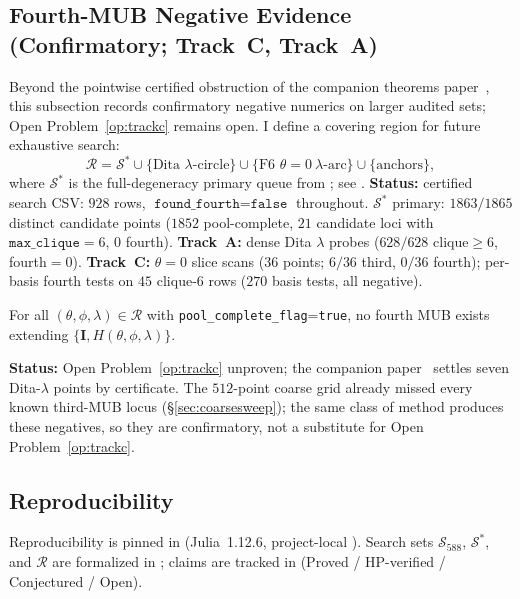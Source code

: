 \documentclass[onecolumn]{IEEEtran}
\begin{document}
\subsection{Fourth-MUB Negative Evidence (Confirmatory; Track~C, Track~A)}
\label{sec:trackc}
Beyond the pointwise certified obstruction of the companion theorems paper~\cite{JaupiTheorems2026}, this subsection records confirmatory negative numerics on larger audited sets; Open Problem~\ref{op:trackc} remains open.
I define a covering region for future exhaustive search:
\[
\mathcal{R}=\mathcal{S}^*\cup\{\text{Dita }\lambda\text{-circle}\}\cup\{\text{F6 }\theta=0\ \lambda\text{-arc}\}\cup\{\text{anchors}\},
\]
where $\mathcal{S}^*$ is the full-degeneracy primary queue from ; see .
\textbf{Status:} certified search CSV: $928$ rows, $\texttt{found\_fourth}=\texttt{false}$ throughout.
$\mathcal{S}^*$ primary: $1863/1865$ distinct candidate points ($1852$ pool-complete, $21$ candidate loci with $\texttt{max\_clique}=6$, $0$ fourth).
\textbf{Track~A:} dense Dita $\lambda$ probes ($628/628$ clique$\ge6$, fourth$=0$).
\textbf{Track~C:} $\theta{=}0$ slice scans ($36$ points; $6/36$ third, $0/36$ fourth); per-basis fourth tests on $45$ clique-$6$ rows ($270$ basis tests, all negative).

\begin{conjecture}
\label{op:trackc}
For all $(\theta,\phi,\lambda)\in\mathcal{R}$ with \texttt{pool\_complete\_flag}=\texttt{true}, no fourth MUB exists extending $\{\mathbf{I},H(\theta,\phi,\lambda)\}$.
\end{conjecture}
\noindent
\textbf{Status:} Open Problem~\ref{op:trackc} unproven; the companion paper~\cite{JaupiTheorems2026} settles seven Dita-$\lambda$ points by certificate.
The $512$-point coarse grid already missed every known third-MUB locus (\S\ref{sec:coarsesweep}); the same class of method produces these negatives, so they are confirmatory, not a substitute for Open Problem~\ref{op:trackc}.

\subsection{Reproducibility}
\label{sec:infra}
Reproducibility is pinned in  (Julia~1.12.6, project-local ).
Search sets $\mathcal{S}_{588}$, $\mathcal{S}^*$, and $\mathcal{R}$ are formalized in ; claims are tracked in  (Proved / HP-verified / Conjectured / Open).
\end{document}

